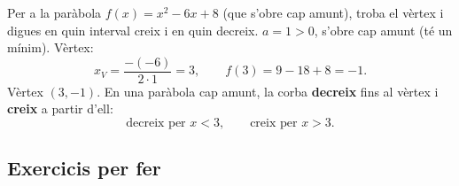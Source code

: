 \begin{exresolt}
Per a la paràbola $f(x)=x^2-6x+8$ (que s'obre cap amunt), troba el vèrtex i digues
en quin interval creix i en quin decreix.
\solucio
$a=1>0$, s'obre cap amunt (té un mínim). Vèrtex:
\[
x_V=\frac{-(-6)}{2\cdot 1}=3,\qquad f(3)=9-18+8=-1.
\]
Vèrtex $(3,-1)$. En una paràbola cap amunt, la corba \textbf{decreix} fins al vèrtex
i \textbf{creix} a partir d'ell:
\[
\text{decreix per } x<3, \qquad \text{creix per } x>3.
\]
\end{exresolt}

\subsection{Exercicis per fer}

